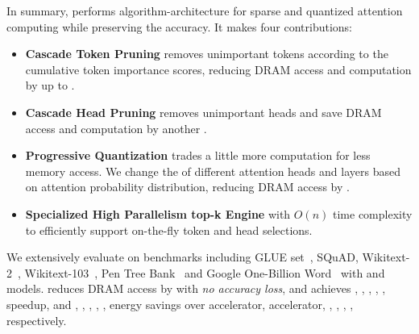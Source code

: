 

In summary, \name performs algorithm-architecture \codesign for sparse and quantized attention computing while preserving the accuracy. It makes four contributions: 
\begin{itemize}
    \item \textbf{Cascade Token Pruning} removes unimportant tokens according to the cumulative token importance scores, reducing DRAM access and computation by up to \prunegpttwodramsaving\x. 
    \item \textbf{Cascade Head Pruning} removes unimportant heads and save DRAM access and computation by another \hpdramsaving\x.
    \item \textbf{Progressive Quantization} trades a little more computation for less memory access. We change the \bitwidths of different attention heads and layers based on attention probability distribution, reducing DRAM access by \dynadramsaving\x.
    \item \textbf{Specialized High Parallelism top-k Engine} with $O(n)$ time complexity to efficiently support on-the-fly token and head selections.
\end{itemize}



We extensively evaluate \name on \numbenchmark benchmarks including GLUE set~\cite{wang-etal-2018-glue}, SQuAD\cite{rajpurkar2016squad}, Wikitext-2~\cite{merity2016pointer}, Wikitext-103~\cite{merity2016pointer}, Pen Tree Bank~\cite{marcus-etal-1993-building} and Google One-Billion Word~\cite{chelba2013one} with \bert and \gpttwo models. \name reduces DRAM access by \totaldramsaving\x with \emph{no accuracy loss}, and achieves \perfoverathree\x, \perfovermnnfast\x, \perfovertitanxp\x, \perfoverxeon\x, \perfovernano\x, \perfoverrasp\x speedup, and \eeoverathree\x, \eeovermnnfast\x, \eeovertitanxp\x, \eeoverxeon\x, \eeovernano\x, \eeoverrasp\x energy savings over \athree accelerator, \mnnfast accelerator, \titanxp, \xeon, \nano, \rasp, respectively.
